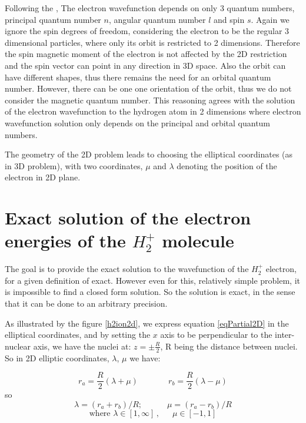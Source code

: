Following the \cite{2DHAtom}, The electron wavefunction depends on only 3 quantum numbers, principal quantum number $ n $, angular quantum number $ l $ and spin $ s $. Again we ignore the spin degrees of freedom, considering the electron to be the regular 3 dimensional particles, where only its orbit is restricted to 2 dimensions.  Therefore the spin magnetic moment of the electron is not affected by the 2D restriction and the spin vector can point in any direction in 3D space. Also the orbit can have different shapes, thus there remains the need for an orbital quantum number. However, there can be one one orientation of the orbit, thus we do not consider the magnetic quantum number. This reasoning agrees with the solution of the electron wavefunction to the hydrogen atom in 2 dimensions \cite{H2atom} where electron wavefunction solution only depends on the principal and orbital quantum numbers.

The geometry of the 2D problem leads to choosing the elliptical coordinates (as in 3D problem), with two coordinates, $ \mu $ and $ \lambda $ denoting the position of the electron in 2D plane. \cite{Arfken}

\section{Exact solution of the electron energies of the \texorpdfstring{$ H_2^+ $}{$H_2^+$} molecule}

The goal is to provide the exact solution to the wavefunction of the $ H_2^{+} $ electron, for a given definition of exact. However even for this, relatively simple problem, it is impossible to find a closed form solution. So the solution is exact, in the sense that it can be done to an arbitrary precision.

As illustrated by the figure  \ref{h2ion2d}, we express equation \eqref{eqPartial2D} in the elliptical coordinates, and by setting the $ x $ axis to be perpendicular to the inter-nuclear axis, we have the nuclei at: $ z = \pm \frac{R}{2}  $, R being the distance between nuclei. So in  2D elliptic coordinates, $ \lambda $, $ \mu $ we have:

\begin{equation}\label{variables1}
r_a = \frac{R}{2}\left(\lambda + \mu \right)\,\,\,\,\,\,\,\,\,\,\,\,\,\,\,\,\,\,\,\,\,\, r_b = \frac{R}{2}\left(\lambda - \mu \right)
\end{equation}
so
\begin{equation}\label{variables1a}
\lambda = \left(r_a + r_b\right)/R;\,\,\,\,\,\,\,\,\,\,\,\,\,\,\,\,\,\,\mu =  \left(r_a - r_b\right)/R
\end{equation}
\begin{equation}
\text{where } \lambda \in \left[1,\infty\right]\,,\,\,\,\,\,\,\,\,\,\mu \in \left[ -1, 1 \right]
\end{equation}

